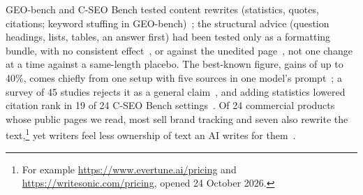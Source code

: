 GEO-bench and C-SEO Bench tested content rewrites (statistics, quotes, citations; keyword stuffing in GEO-bench)~\cite{aggarwal2024geo,puerto2025cseo}; the structural advice (question headings, lists, tables, an answer first) had been tested only as a formatting bundle, with no consistent effect~\cite{vishwakarma2026cited}, or against the unedited page~\cite{puerto2025cseo}, not one change at a time against a same-length placebo.
The best-known figure, gains of up to 40\%, comes chiefly from one setup with five sources in one model's prompt~\cite{aggarwal2024geo}; a survey of 45 studies rejects it as a general claim~\cite{martinez2026survey}, and adding statistics lowered citation rank in 19 of 24 C-SEO Bench settings~\cite{puerto2025cseo}.
Of 24 commercial products whose public pages we read, most sell brand tracking and seven also rewrite the text,\footnote{For example \url{https://www.evertune.ai/pricing} and \url{https://writesonic.com/pricing}, opened 24 October 2026.} yet writers feel less ownership of text an AI writes for them~\cite{draxler2024ghostwriter}.

